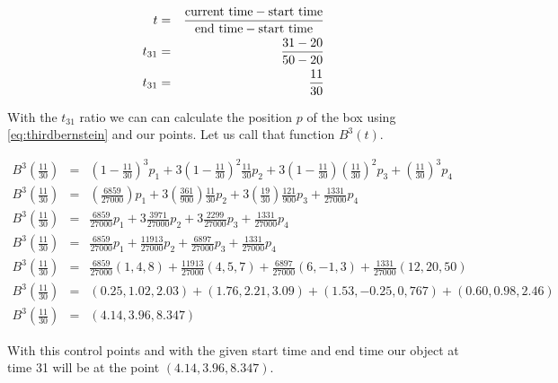 \documentclass[12pt]{article}
\begin{document}
\begin{eqnarray*}
    t &=& \frac{\textnormal{current time} - \textnormal{start time}}{\textnormal{end time} - \textnormal{start time}}\\
    t_{31} &=& \frac{31 - 20}{50-20}\\
    t_{31} &=& \frac{11}{30}
\end{eqnarray*}

With the $t_{31}$ ratio we can can calculate the position $p$ of the box using \ref{eq:thirdbernstein} and our points. Let us call that function $B^3(t)$.

\begin{eqnarray*}
    B^3\left(\frac{11}{30}\right) &=& \left(1-\frac{11}{30}\right)^3 p_1 + 3\left(1-\frac{11}{30}\right)^2 \frac{11}{30} p_2 + 3\left(1-\frac{11}{30}\right) \left(\frac{11}{30}\right)^2 p_3 + \left(\frac{11}{30}\right)^3 p_4\\
    B^3\left(\frac{11}{30}\right) &=& \left(\frac{6859}{27000}\right) p_1 + 3\left(\frac{361}{900}\right) \frac{11}{30} p_2 + 3\left(\frac{19}{30}\right) \frac{121}{900} p_3 + \frac{1331}{27000} p_4\\
    B^3 \left( \frac{11}{30} \right) &=& \frac{6859}{27000} p_1 + 3 \frac{3971}{27000} p_2 + 3 \frac{2299}{27000} p_3 + \frac{1331}{27000} p_4\\
    B^3 \left( \frac{11}{30} \right) &=& \frac{6859}{27000} p_1 + \frac{11913}{27000} p_2 + \frac{6897}{27000} p_3 + \frac{1331}{27000} p_4\\
    B^3 \left( \frac{11}{30} \right) &=& \frac{6859}{27000} (1,4,8) + \frac{11913}{27000} (4,5,7) + \frac{6897}{27000} (6,-1,3) + \frac{1331}{27000} (12,20,50)\\
    B^3\left(\frac{11}{30}\right) &=& (0.25, 1.02, 2.03) + (1.76, 2.21, 3.09) + (1.53, -0.25, 0,767) + (0.60, 0.98, 2.46)\\
    B^3\left(\frac{11}{30}\right) &=& (4.14, 3.96, 8.347)
\end{eqnarray*}

With this control points and with the given start time and end time our object
at time 31 will be at the point $(4.14,3.96,8.347)$.
\end{document}
